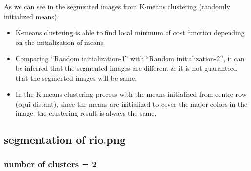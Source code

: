 \documentclass[fleqn]{article}
\begin{document}
As we can see in the segmented images from K-means clustering (randomly initialized means), 
\begin{itemize}
  \item K-means clustering is able to find local minimum of cost function depending on the initialization of means
  \item Comparing ``Random initialization-1'' with ``Random initialization-2'', it can be inferred that the segmented images are different \& it is not guaranteed that the segmented images will be same.
  \item In the K-means clustering process with the means initialized from centre row (equi-distant), since the means are initialized to cover the major colors in the image, the clustering result is always the same. 
\end{itemize}
\subsection{segmentation of rio.png}

\subsubsection{number of clusters = 2}
\end{document}
